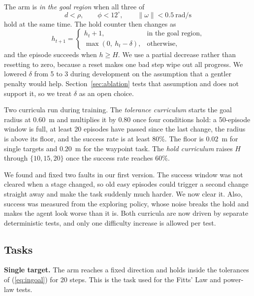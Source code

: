 \documentclass[conference]{IEEEtran}
\begin{document}
The arm is \emph{in the goal region} when all three of
\begin{equation}
d < \rho, \qquad \phi < 12^{\circ}, \qquad
\lVert \omega \rVert < 0.5\ \mathrm{rad/s}
\label{eq:ingoal}
\end{equation}
hold at the same time. The hold counter then changes as
\begin{equation}
h_{t+1} =
\begin{cases}
h_t + 1, & \text{in the goal region},\\
\max(0,\ h_t - \delta), & \text{otherwise},
\end{cases}
\label{eq:hold}
\end{equation}
and the episode succeeds when $h \geq H$. We use a partial decrease rather than
resetting to zero, because a reset makes one bad step wipe out all progress. We
lowered $\delta$ from 5 to 3 during development on the assumption that a gentler
penalty would help. Section~\ref{sec:ablation} tests that assumption and does
not support it, so we treat $\delta$ as an open choice.

Two curricula run during training. The \emph{tolerance curriculum} starts the
goal radius at $0.60$~m and multiplies it by $0.80$ once four conditions hold: a
50-episode window is full, at least 20 episodes have passed since the last
change, the radius is above its floor, and the success rate is at least 80\%.
The floor is $0.02$~m for single targets and $0.20$~m for the waypoint task.
The \emph{hold curriculum} raises $H$ through $\{10,15,20\}$ once the success
rate reaches 60\%.

We found and fixed two faults in our first version. The success window was not
cleared when a stage changed, so old easy episodes could trigger a second
change straight away and make the task suddenly much harder. We now clear it.
Also, success was measured from the exploring policy, whose noise breaks the
hold and makes the agent look worse than it is. Both curricula are now driven
by separate deterministic tests, and only one difficulty increase is allowed
per test.

\subsection{Tasks}
\label{sec:tasks}

\textbf{Single target.} The arm reaches a fixed direction and holds inside the
tolerances of (\ref{eq:ingoal}) for 20 steps. This is the task used for the
Fitts' Law and power-law tests.
\end{document}
